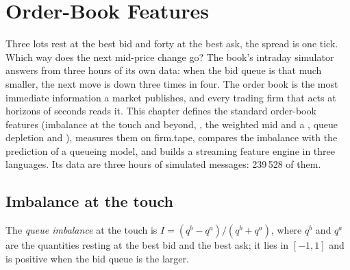 \chapter{Order-Book Features}\label{ch:rs:order-book-features}

Three lots rest at the best bid and forty at the best ask, the spread is one tick. Which way does the next mid-price change
go? The book's intraday simulator answers from three hours of its own data: when the bid queue is that much smaller, the next
move is down three times in four. The order book is the most immediate information a market publishes, and every trading firm
that acts at horizons of seconds reads it. This chapter defines the standard order-book features (imbalance at the touch and
beyond, , the weighted mid and a , queue depletion and ), measures them on
firm.tape, compares the imbalance with the prediction of a queueing model, and builds a streaming feature engine in three
languages. Its data are three hours of simulated messages: 239\,528 of them.

\section{Imbalance at the touch}

\begin{definition}\label{def:rs:order-book-features:imbalance}
The \emph{queue imbalance} at the touch is $I = (q^b - q^a)/(q^b + q^a)$, where $q^b$ and $q^a$ are the
quantities resting at the best bid and the best ask; it lies in $[-1, 1]$ and is positive when the bid queue is the larger.
\end{definition}

